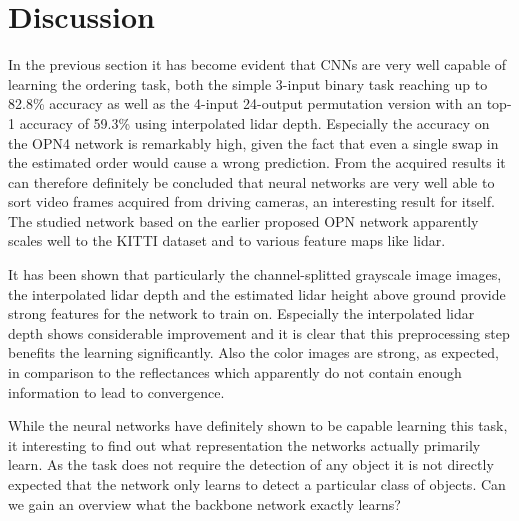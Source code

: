 %
\newpage
\chapter{Discussion}
\label{ch:discussion}
In the previous section it has become evident that CNNs are very well capable of learning the ordering task, both the simple 3-input binary task reaching up to 82.8\% accuracy as well as the 4-input 24-output permutation version with an top-1 accuracy of 59.3\% using interpolated lidar depth. Especially the accuracy on the OPN4 network is remarkably high, given the fact that even a single swap in the estimated order would cause a wrong prediction. From the acquired results it can therefore definitely be concluded that neural networks are very well able to sort video frames acquired from driving cameras, an interesting result for itself. The studied network based on the earlier proposed OPN network \cite{lee2017} apparently scales well to the KITTI dataset and to various feature maps like lidar.

It has been shown that particularly the channel-splitted grayscale image images, the interpolated lidar depth and the estimated lidar height above ground provide strong features for the network to train on. Especially the interpolated lidar depth shows considerable improvement and it is clear that this preprocessing step benefits the learning significantly. Also the color images are strong, as expected, in comparison to the reflectances which apparently do not contain enough information to lead to convergence.


While the neural networks have definitely shown to be capable learning this task, it interesting to find out what representation the networks actually primarily learn. As the task does not require the detection of any object it is not directly expected that the network only learns to detect a particular class of objects. Can we gain an overview what the backbone network exactly learns? 

